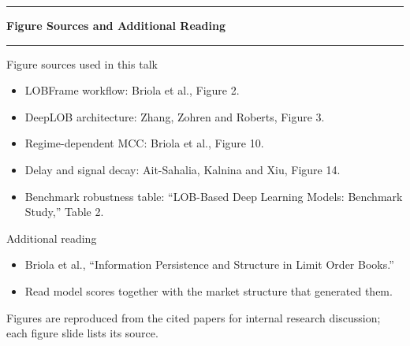 \documentclass[aspectratio=169,10pt]{beamer}
\newcommand{\tightitems}{\setlength{\itemsep}{0.35em}}
\newcommand{\contentheader}[1]{%
  \vspace*{0.05em}%
  {\noindent\color{BrandOrange}\rule{0.42em}{0.42em}\hspace{0.50em}\bfseries\Large #1\par}%
  \vspace{0.15em}%
  {\color{BrandOrange}\rule{\textwidth}{1.4pt}\par}%
  \vspace{0.42em}%
}
\begin{document}
\begin{frame}[plain]
\contentheader{Figure Sources and Additional Reading}
\scriptsize
\begin{block}{Figure sources used in this talk}
\begin{itemize}\tightitems
  \item LOBFrame workflow: Briola et al., Figure 2.
  \item DeepLOB architecture: Zhang, Zohren and Roberts, Figure 3.
  \item Regime-dependent MCC: Briola et al., Figure 10.
  \item Delay and signal decay: Ait-Sahalia, Kalnina and Xiu, Figure 14.
  \item Benchmark robustness table: ``LOB-Based Deep Learning Models: Benchmark Study,'' Table 2.
\end{itemize}
\end{block}
\begin{block}{Additional reading}
\begin{itemize}\tightitems
  \item Briola et al., ``Information Persistence and Structure in Limit Order Books.''
  \item Read model scores together with the market structure that generated them.
\end{itemize}
\end{block}
{\tiny Figures are reproduced from the cited papers for internal research discussion; each figure slide lists its source.}
\end{frame}
\end{document}
